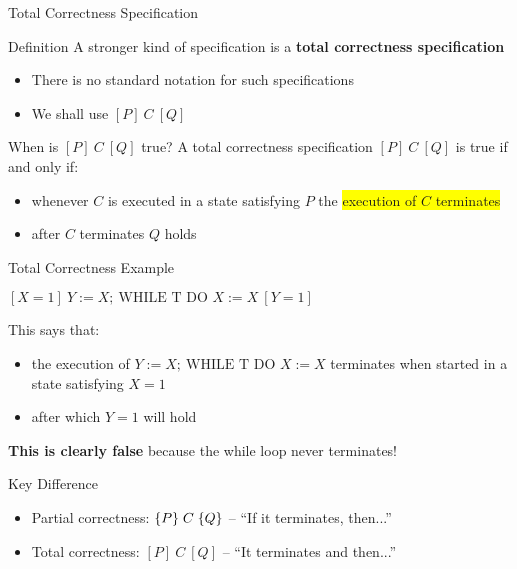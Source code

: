 \begin{frame}{Total Correctness Specification}
    \begin{block}{Definition}
        A stronger kind of specification is a \textbf{total correctness specification}
        \begin{itemize}
            \item There is no standard notation for such specifications
            \item We shall use $[P]\ C\ [Q]$
        \end{itemize}
    \end{block}
    
    \begin{block}{When is $[P]\ C\ [Q]$ true?}
        A total correctness specification $[P]\ C\ [Q]$ is true if and only if:
        \begin{itemize}
            \item whenever $C$ is executed in a state satisfying $P$ the \colorbox{yellow}{execution of $C$ terminates}
            \item after $C$ terminates $Q$ holds
        \end{itemize}
    \end{block}
\end{frame}

\begin{frame}{Total Correctness Example}
    \begin{example}
        $[X = 1]\ Y := X;\ \text{WHILE T DO } X := X\ [Y = 1]$
        
        This says that:
        \begin{itemize}
            \item the execution of $Y := X;\ \text{WHILE T DO } X := X$ terminates when started in a state satisfying $X = 1$
            \item after which $Y = 1$ will hold
        \end{itemize}
        
        \textbf{This is clearly false} because the while loop never terminates!
    \end{example}
    
    \begin{alertblock}{Key Difference}
        \begin{itemize}
            \item Partial correctness: $\{P\}\; C\; \{Q\}$ -- ``If it terminates, then...''
            \item Total correctness: $[P]\ C\ [Q]$ -- ``It terminates and then...''
        \end{itemize}
    \end{alertblock}
\end{frame}

